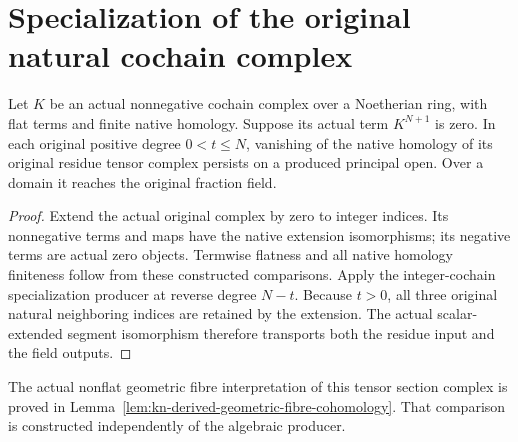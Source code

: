 \section{Specialization of the original natural cochain complex}

\begin{theorem}
\label{thm:kn-derived-natural-cochain-specialization}
\leanok
Let $K$ be an actual nonnegative cochain complex over a Noetherian
ring, with flat terms and finite native homology.  Suppose its
actual term $K^{N+1}$ is zero.  In each original positive degree
$0<t\leq N$, vanishing of the native homology of its original
residue tensor complex persists on a produced principal open.
Over a domain it reaches the original fraction field.
\end{theorem}
\begin{proof}
Extend the actual original complex by zero to integer indices.
Its nonnegative terms and maps have the native extension
isomorphisms; its negative terms are actual zero objects.
Termwise flatness and all native homology finiteness follow from
these constructed comparisons.  Apply the integer-cochain
specialization producer at reverse degree $N-t$.  Because $t>0$,
all three original natural neighboring indices are retained by
the extension.  The actual scalar-extended segment isomorphism
therefore transports both the residue input and the field outputs.
\end{proof}

\begin{remark}
The actual nonflat geometric fibre interpretation of this tensor
section complex is proved in
Lemma~\ref{lem:kn-derived-geometric-fibre-cohomology}.  That
comparison is constructed independently of the algebraic producer.
\end{remark}
